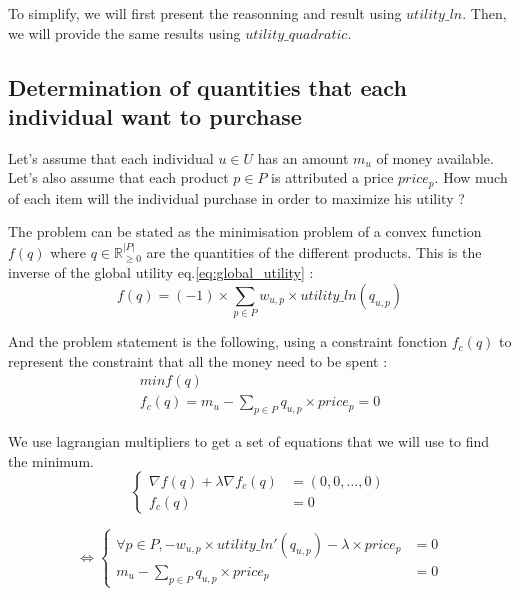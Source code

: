 To simplify, we will first present the reasonning and result using $utility\_ln$.
Then, we will provide the same results using $utility\_quadratic$.

\subsection{Determination of quantities that each individual want to purchase}

Let's assume that each individual $u\in U$ has an amount $m_u$ of money available.
Let's also assume that each product $p\in P$ is attributed a price $price_p$.
How much of each item will the individual purchase in order to maximize his utility ?

The problem can be stated as the minimisation problem of a convex function $f(q)$ where $q\in \mathbb{R}_{\ge0}^{|P|}$ are the quantities of the different products.
This is the inverse of the global utility eq.\eqref{eq:global_utility} :
\begin{equation*}
    f(q) = (-1)\times \sum_{p\in P} w_{u, p}\times utility\_ln(q_{u, p})
\end{equation*}

And the problem statement is the following, using a constraint fonction $f_c(q)$ to represent the constraint that all the money need to be spent :
\begin{equation}
\begin{split}
    min f(q) \\
    f_c(q) = m_u - \sum_{p\in P}q_{u, p}\times price_p = 0
\end{split}
\end{equation}

We use lagrangian multipliers to get a set of equations that we will use to find the minimum.
\begin{equation*}
\begin{cases}
\nabla f(q) + \lambda \nabla f_c(q) & = (0, 0, \dots, 0) \\
f_c(q) & = 0
\end{cases}
\end{equation*}

\begin{equation*}
\Leftrightarrow 
\begin{cases}
\forall p\in P, - w_{u,p}\times utility\_ln'(q_{u, p}) - \lambda \times price_p & = 0 \\
m_u - \sum_{p\in P}q_{u, p}\times price_p & = 0
\end{cases}
\end{equation*}

